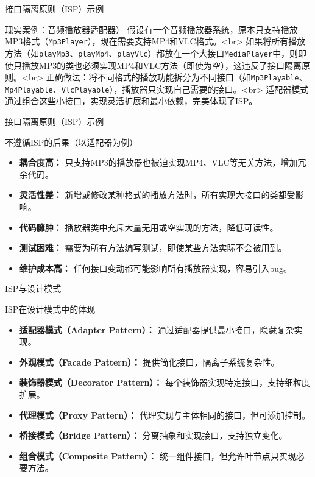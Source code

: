 \documentclass[UTF8,aspectratio=169]{beamer}
\begin{document}
\begin{frame}{接口隔离原则（ISP）示例}
    \begin{exampleytublock}{现实案例：音频播放器适配器）}
        假设有一个音频播放器系统，原本只支持播放MP3格式（\texttt{Mp3Player}），现在需要支持MP4和VLC格式。<br>
        如果将所有播放方法（如\texttt{playMp3}、\texttt{playMp4}、\texttt{playVlc}）都放在一个大接口\texttt{MediaPlayer}中，则即使只播放MP3的类也必须实现MP4和VLC方法（即使为空），这违反了接口隔离原则。<br>
        正确做法：将不同格式的播放功能拆分为不同接口（如\texttt{Mp3Playable}、\texttt{Mp4Playable}、\texttt{VlcPlayable}），播放器只实现自己需要的接口。<br>
        适配器模式通过组合这些小接口，实现灵活扩展和最小依赖，完美体现了ISP。
    \end{exampleytublock}
\end{frame}

\begin{frame}{接口隔离原则（ISP）示例}
    \begin{alertytublock}{不遵循ISP的后果（以适配器为例）}
        \begin{itemize}
            \item \textbf{耦合度高：} 只支持MP3的播放器也被迫实现MP4、VLC等无关方法，增加冗余代码。
            \item \textbf{灵活性差：} 新增或修改某种格式的播放方法时，所有实现大接口的类都受影响。
            \item \textbf{代码臃肿：} 播放器类中充斥大量无用或空实现的方法，降低可读性。
            \item \textbf{测试困难：} 需要为所有方法编写测试，即使某些方法实际不会被用到。
            \item \textbf{维护成本高：} 任何接口变动都可能影响所有播放器实现，容易引入bug。
        \end{itemize}
    \end{alertytublock}
\end{frame}

\begin{frame}{ISP与设计模式}
    \begin{ytublock}{ISP在设计模式中的体现}
        \begin{itemize}
            \item \textbf{适配器模式（Adapter Pattern）：} 通过适配器提供最小接口，隐藏复杂实现。
            \item \textbf{外观模式（Facade Pattern）：} 提供简化接口，隔离子系统复杂性。
            \item \textbf{装饰器模式（Decorator Pattern）：} 每个装饰器实现特定接口，支持细粒度扩展。
            \item \textbf{代理模式（Proxy Pattern）：} 代理实现与主体相同的接口，但可添加控制。
            \item \textbf{桥接模式（Bridge Pattern）：} 分离抽象和实现接口，支持独立变化。
            \item \textbf{组合模式（Composite Pattern）：} 统一组件接口，但允许叶节点只实现必要方法。
        \end{itemize}
    \end{ytublock}
\end{frame}
\end{document}
